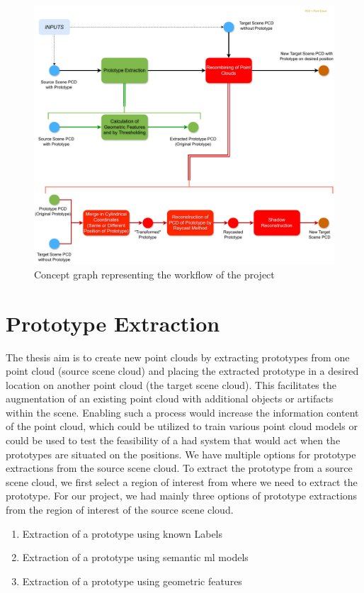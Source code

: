 \begin{figure}[htbp]
    \centering
    \includegraphics[width=1\linewidth]{97_graphics/concepts/graph_main.pdf}
    \caption{Concept graph representing the workflow of the project}
    \label{fig:concept-graph}
\end{figure}



\section{Prototype Extraction}
The thesis aim is to create new point clouds by extracting prototypes from one point cloud (source scene cloud) and placing the extracted prototype in a desired location on another point cloud (the target scene cloud). This facilitates the augmentation of an existing point cloud with additional objects or artifacts within the scene. Enabling such a process would increase the information content of the point cloud, which could be utilized to train various point cloud models or could be used to test the feasibility of a \acrshort{had} system that would act when the prototypes are situated on the positions.
We have multiple options for prototype extractions from the source scene cloud. To extract the prototype from a source scene cloud, we first select a region of interest from where we need to extract the prototype. For our project, we had mainly three options of prototype extractions from the region of interest of the source scene cloud. 
\begin{enumerate}
    \item Extraction of a prototype using known Labels
    \item Extraction of a prototype using semantic \acrshort{ml} models
    \item Extraction of a prototype using geometric features
\end{enumerate}

